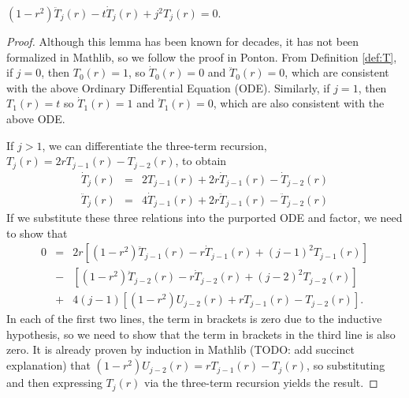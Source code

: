 \begin{lemma}
  \label{lem:ODE}
  $\left(1 - r^2\right) \ddot{T}_{j}\left(r\right) - t \dot{T}_{j}\left(r\right) + j^2 T_j\left(r\right) = 0$.
\end{lemma}
\begin{proof}
  Although this lemma has been known for decades, it has not been formalized in Mathlib, so we follow the proof in Ponton. From Definition \ref{def:T}, if $j = 0$, then $T_0\left(r\right) = 1$, so $\dot{T}_0\left(r\right) = 0$ and $\ddot{T}_0\left(r\right) = 0$, which are consistent with the above Ordinary Differential Equation (ODE). Similarly, if $j = 1$, then $T_1\left(r\right) = t$ so $\dot{T}_1\left(r\right) = 1$ and $\ddot{T}_1\left(r\right) = 0$, which are also consistent with the above ODE.
  
  If $j > 1$, we can differentiate the three-term recursion, $T_j\left(r\right) = 2 r T_{j - 1}\left(r\right) - T_{j - 2}\left(r\right)$, to obtain
  \begin{eqnarray*}
    \dot{T}_j\left(r\right)  &=& 2 T_{j - 1}\left(r\right) + 2 r \dot{T}_{j - 1}\left(r\right) - \dot{T}_{j - 2}\left(r\right) \\
    \ddot{T}_j\left(r\right) &=& 4 \dot{T}_{j - 1}\left(r\right) + 2 r \ddot{T}_{j - 1}\left(r\right) - \ddot{T}_{j - 2}\left(r\right)
  \end{eqnarray*}
  If we substitute these three relations into the purported ODE and factor, we need to show that
  \begin{eqnarray*}
  0 &=& 2r \left[ \left(1 - r^2\right) \ddot{T}_{j - 1}\left(r\right) - r \dot{T}_{j - 1}\left(r\right) + \left(j - 1\right)^2 T_{j - 1}\left(r\right) \right] \\
    &-& \left[\left(1 - r^2\right) \ddot{T}_{j - 2}\left(r\right) - r \dot{T}_{j - 2}\left(r\right) + \left(j - 2\right)^2 T_{j - 2}\left(r\right)  \right] \\
    &+& 4 \left(j - 1\right) \left[\left(1 - r^2\right) U_{j - 2}\left(r\right) +  r T_{j - 1}\left(r\right) - T_{j - 2}\left(r\right)  \right].
  \end{eqnarray*}
  In each of the first two lines, the term in brackets is zero due to the inductive hypothesis, so we need to show that the term in brackets in the third line is also zero. It is already proven by induction in Mathlib (TODO: add succinct explanation) that $\left(1 - r^2\right) U_{j - 2}\left(r\right) = r T_{j - 1}\left(r\right) - T_{j}\left(r\right)$, so substituting and then expressing $T_{j}\left(r\right)$ via the three-term recursion yields the result.
\end{proof}


